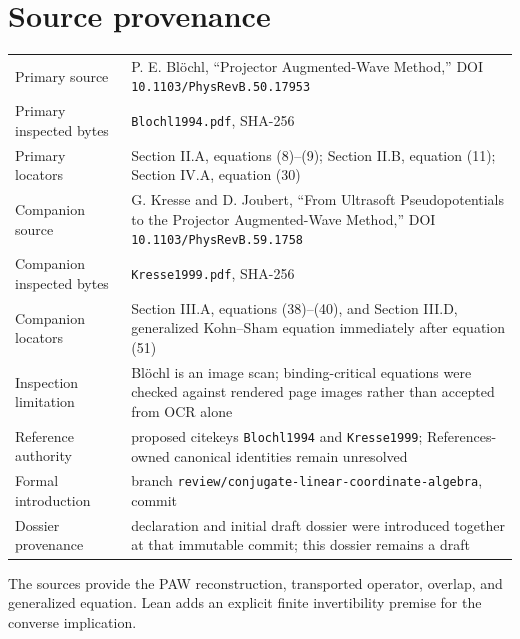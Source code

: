 \section{Source provenance}
\begin{tabularx}{\textwidth}{@{}lY@{}}
\toprule
Primary source & P. E. Bl\"ochl, ``Projector Augmented-Wave Method,'' DOI \texttt{10.1103/PhysRevB.50.17953} \\
Primary inspected bytes & \texttt{Blochl1994.pdf}, SHA-256  \\
Primary locators & Section II.A, equations (8)--(9); Section II.B, equation (11); Section IV.A, equation (30) \\
Companion source & G. Kresse and D. Joubert, ``From Ultrasoft Pseudopotentials to the Projector Augmented-Wave Method,'' DOI \texttt{10.1103/PhysRevB.59.1758} \\
Companion inspected bytes & \texttt{Kresse1999.pdf}, SHA-256  \\
Companion locators & Section III.A, equations (38)--(40), and Section III.D, generalized Kohn--Sham equation immediately after equation (51) \\
Inspection limitation & Bl\"ochl is an image scan; binding-critical equations were checked against rendered page images rather than accepted from OCR alone \\
Reference authority & proposed citekeys \texttt{Blochl1994} and \texttt{Kresse1999}; References-owned canonical identities remain unresolved \\
Formal introduction & branch \texttt{review/conjugate-linear-coordinate-algebra}, commit  \\
Dossier provenance & declaration and initial draft dossier were introduced together at that immutable commit; this dossier remains a draft \\
\bottomrule
\end{tabularx}
The sources provide the PAW reconstruction, transported operator, overlap, and generalized equation.
Lean adds an explicit finite invertibility premise for the converse implication.

